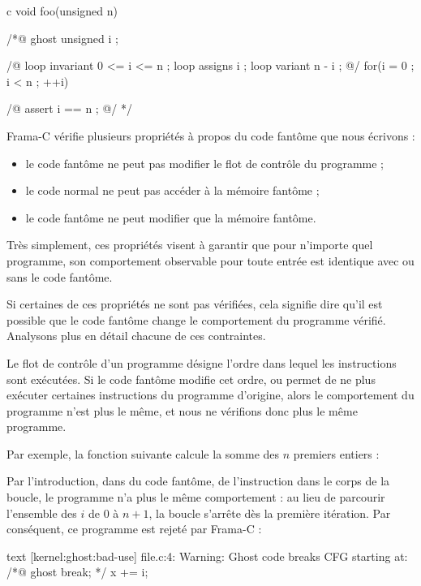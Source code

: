 \begin{CodeBlock}{c}
void foo(unsigned n){
 /*@ ghost
   unsigned i ;

   /@
     loop invariant 0 <= i <= n ;
     loop assigns i ;
     loop variant n - i ;
   @/
   for(i = 0 ; i < n ; ++i){

   }
   /@ assert i == n ; @/
 */
}
\end{CodeBlock}




Frama-C vérifie plusieurs propriétés à propos du code fantôme que nous écrivons :
\begin{itemize}
\item le code fantôme ne peut pas modifier le flot de contrôle du programme ;
\item le code normal ne peut pas accéder à la mémoire fantôme ;
\item le code fantôme ne peut modifier que la mémoire fantôme.
\end{itemize}


Très simplement, ces propriétés visent à garantir que pour n'importe
quel programme, son comportement observable pour toute entrée est identique
avec ou sans le code fantôme.


Si certaines de ces propriétés ne sont pas vérifiées, cela signifie dire qu'il
est possible que le code fantôme change le comportement du programme vérifié.
Analysons plus en détail chacune de ces contraintes.




Le flot de contrôle d'un programme désigne l'ordre dans lequel les instructions sont
exécutées. Si le code fantôme modifie cet ordre, ou permet de ne
plus exécuter certaines instructions du programme d'origine, alors le comportement
du programme n'est plus le même, et nous ne vérifions donc plus le même programme.


Par exemple, la fonction suivante calcule la somme des $n$ premiers entiers :




Par l'introduction, dans du code fantôme, de l'instruction  dans
le corps de la boucle, le programme n'a plus le même comportement : au lieu de
parcourir l'ensemble des $i$ de $0$ à $n+1$, la boucle s'arrête dès la première
itération. Par conséquent, ce programme est rejeté par Frama-C :


\begin{CodeBlock}{text}
[kernel:ghost:bad-use] file.c:4: Warning:
  Ghost code breaks CFG starting at:
  /*@ ghost break; */
  x += i;
\end{CodeBlock}



